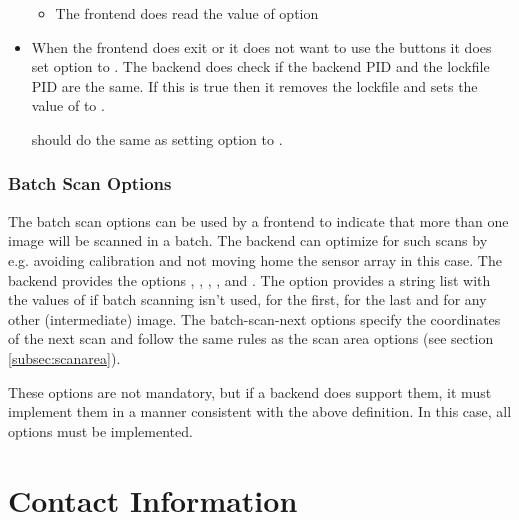 \documentclass[11pt,DVIps]{report}
\begin{document}
\begin{changebar}
\begin{itemize}
\begin{itemize}
  \item
  The frontend does read the value of option 
  \end{itemize}

\item
When the frontend does exit or it does not want to use the buttons
it does set option  to .
The backend does check if the backend PID and the lockfile PID are
the same. If this is true then it removes the lockfile and sets the value 
of  to .

 should do the same as setting option
 to .

\end{itemize}
\end{changebar}

\begin{changebar}
\subsection{Batch Scan Options}

The batch scan options can be used by a frontend to indicate that more than
one image will be scanned in a batch. The backend can optimize for such scans
by e.g. avoiding calibration and not moving home the sensor array in this case.
The backend provides the options ,
, ,
, and . The option
 provides a string list with the values of  if
batch scanning isn't used,  for the first,  for the last
and  for any other (intermediate) image.  The batch-scan-next
options specify the coordinates of the next scan and follow the same rules as
the scan area options (see section \ref{subsec:scanarea}).

These options are not mandatory, but if a backend does support them, it must
implement them in a manner consistent with the above definition.  In this
case, all options must be implemented.
\end{changebar}






\chapter{Contact Information}\label{chap:contact}
\end{document}
